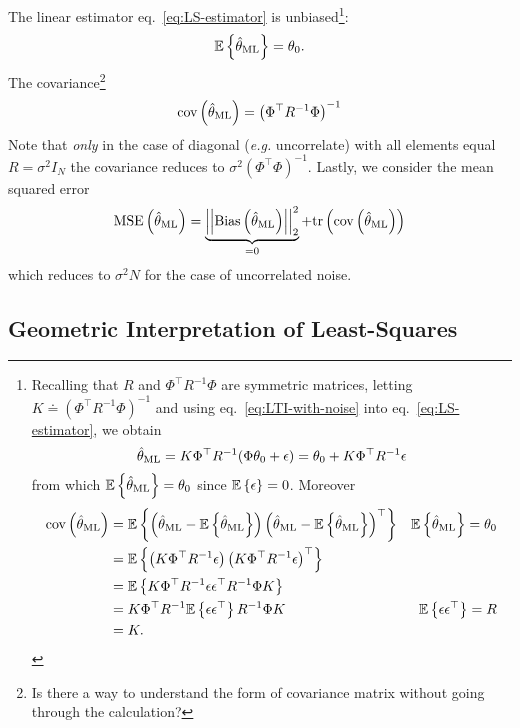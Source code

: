 The linear estimator eq.~\eqref{eq:LS-estimator} is unbiased\footnote{Recalling that $R$ and $\Phi^\top R^{-1} \Phi$ are symmetric matrices, letting $K\doteq (\Phi^\top R^{-1} \Phi)^{-1}$ and using eq.~\eqref{eq:LTI-with-noise} into eq.~\eqref{eq:LS-estimator}, we obtain
  \begin{equation}
    \label{eq:thetaLS-estimate}
    \hat{\theta}_\textrm{ML} = K\Phi^\top R^{-1}(\Phi\theta_0 + \epsilon) = \theta_0 + K\Phi^\top R^{-1}\epsilon
  \end{equation}
  from which $\mathbb{E}\left\{\hat{\theta}_\textrm{ML}\right\} = \theta_0$ since $\mathbb{E}\left\{\epsilon\right\}=0$. Moreover
  \begin{align*}
    \textrm{cov}\left(\hat{\theta}_\textrm{ML}\right) &= \mathbb{E}\left\{\left(\hat{\theta}_\textrm{ML} - \mathbb{E}\left\{\hat{\theta}_\textrm{ML}\right\}\right) \left(\hat{\theta}_\textrm{ML} - \mathbb{E}\left\{\hat{\theta}_\textrm{ML}\right\}\right)^\top\right\} & \mathbb{E}\left\{\hat{\theta}_\textrm{ML}\right\} = \theta_0 \\
                   &= \mathbb{E}\left\{\left(K \Phi^\top R^{-1}\epsilon\right) \left(K \Phi^\top R^{-1}\epsilon\right)^\top\right\} \\
                   &= \mathbb{E}\left\{K \Phi^\top R^{-1}\epsilon \epsilon^\top R^{-1}\Phi K\right\} \\
                   &= K \Phi^\top R^{-1}\mathbb{E}\left\{\epsilon \epsilon^\top\right\} R^{-1} \Phi K & \mathbb{E}\left\{\epsilon \epsilon^\top\right\} = R \\
                   &= K.
  \end{align*}}:
\begin{equation*}
  \mathbb{E}\left\{\hat{\theta}_\textrm{ML}\right\} = \theta_0.
\end{equation*}
The covariance\footnote{Is there a way to understand the form of covariance matrix without going through the calculation?}
\begin{equation*}
  \textrm{cov}\left(\hat{\theta}_\textrm{ML}\right) = \left(\Phi^\top R^{-1}\Phi\right)^{-1}
\end{equation*}
Note that \emph{only} in the case of diagonal (\textit{e.g.} uncorrelate) with all elements equal $R=\sigma^2I_N$ the covariance reduces to $\sigma^2\left(\Phi^\top \Phi\right)^{-1}$. Lastly, we consider the mean squared error
\begin{equation*}
  \textrm{MSE}\left(\hat{\theta}_\textrm{ML}\right) = \underbrace{\left|\left|\textrm{Bias}\left(\hat{\theta}_\textrm{ML}\right)\right|\right|_2^2}_{=0} + \textrm{tr}\left(\textrm{cov}\left(\hat{\theta}_\textrm{ML}\right)\right)
\end{equation*}
which reduces to $\sigma^2N$ for the case of uncorrelated noise.

\subsection{Geometric Interpretation of Least-Squares}

